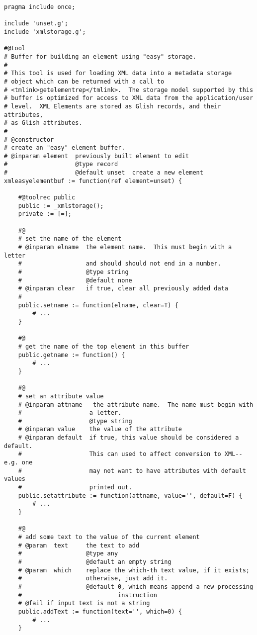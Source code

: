 \begin{verbatim}
pragma include once;

include 'unset.g';
include 'xmlstorage.g';

#@tool 
# Buffer for building an element using "easy" storage.  
# 
# This tool is used for loading XML data into a metadata storage
# object which can be returned with a call to 
# <tmlink>getelementrep</tmlink>.  The storage model supported by this
# buffer is optimized for access to XML data from the application/user 
# level.  XML Elements are stored as Glish records, and their attributes,
# as Glish attributes.  
# 
# @constructor
# create an "easy" element buffer.
# @inparam element  previously built element to edit
#                   @type record
#                   @default unset  create a new element
xmleasyelementbuf := function(ref element=unset) {

    #@toolrec public
    public := _xmlstorage();
    private := [=];

    #@
    # set the name of the element
    # @inparam elname  the element name.  This must begin with a letter
    #                  and should should not end in a number.
    #                  @type string
    #                  @default none
    # @inparam clear   if true, clear all previously added data
    # 
    public.setname := function(elname, clear=T) {
        # ...
    }

    #@ 
    # get the name of the top element in this buffer
    public.getname := function() {
        # ...
    }

    #@
    # set an attribute value
    # @inparam attname   the attribute name.  The name must begin with 
    #                   a letter.
    #                   @type string
    # @inparam value    the value of the attribute
    # @inparam default  if true, this value should be considered a default.
    #                   This can used to affect conversion to XML--e.g. one
    #                   may not want to have attributes with default values
    #                   printed out.
    public.setattribute := function(attname, value='', default=F) {
        # ...
    }

    #@ 
    # add some text to the value of the current element
    # @param  text     the text to add
    #                  @type any
    #                  @default an empty string
    # @param  which    replace the which-th text value, if it exists;
    #                  otherwise, just add it.
    #                  @default 0, which means append a new processing 
    #                           instruction
    # @fail if input text is not a string
    public.addText := function(text='', which=0) {
        # ...
    }


\end{verbatim}
